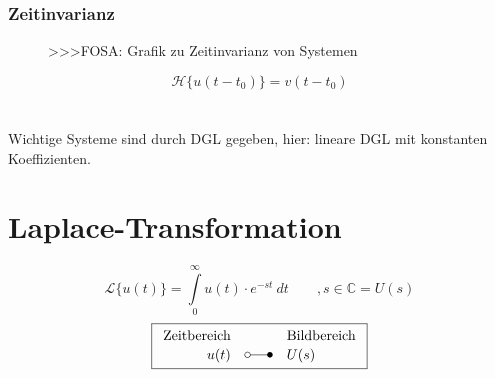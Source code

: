 \subsubsection{Zeitinvarianz}
\begin{figure}[h!]
    \centering
    >>>FOSA: Grafik zu Zeitinvarianz von Systemen
    \caption{}
    \label{fig:timesystem}
\end{figure}
\[ \boxed{\mathcal{H} \lbrace u(t-t_0) \rbrace 
= v(t - t_0)} \]
\\\\
Wichtige Systeme sind durch DGL gegeben, hier: lineare DGL mit konstanten 
Koeffizienten. 

\section{Laplace-Transformation}
\[ \boxed{\mathcal{L} \lbrace u(t) \rbrace 
= \int\limits_{0}^{\infty} u(t) \cdot e^{-st} ~ dt \qquad , s \in \mathbb{C} 
= U(s)} \]
\[ \boxed{\begin{array}{rcl}
\text{Zeitbereich} &  & \text{Bildbereich} \\
u(t) & \laplace & U(s)
\end{array}} \]
